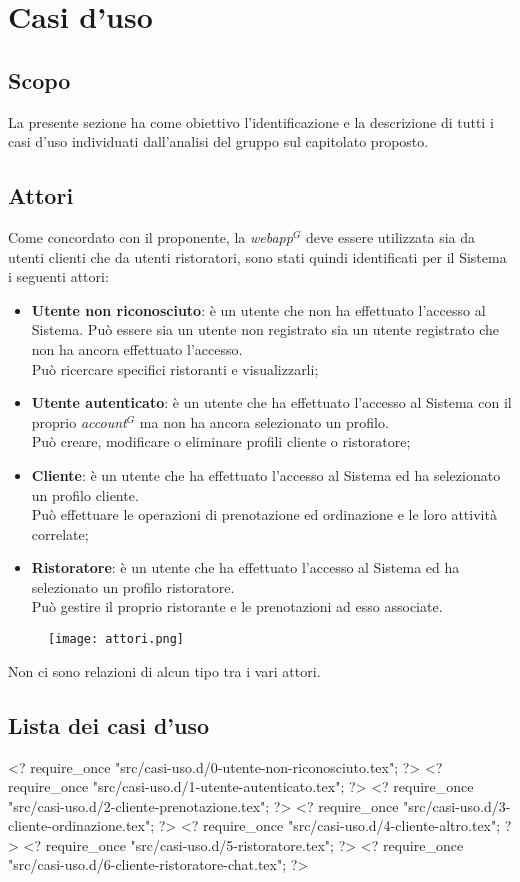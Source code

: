 \nonstopmode
\section{Casi d'uso}
\subsection{Scopo}

La presente sezione ha come obiettivo l'identificazione e la descrizione di tutti i casi d'uso individuati dall'analisi del gruppo sul capitolato proposto.

\subsection{Attori}
Come concordato con il proponente, la \emph{webapp}$^{G}$ deve essere utilizzata sia da utenti clienti che da utenti ristoratori, sono stati quindi identificati per il Sistema i seguenti attori:

\begin{itemize}
\item \textbf{Utente non riconosciuto}: è un utente che non ha effettuato l'accesso al Sistema. Può essere sia un utente non registrato sia un utente registrato che non ha ancora effettuato l'accesso.\\ Può ricercare specifici ristoranti e visualizzarli;
\item \textbf{Utente autenticato}: è un utente che ha effettuato l'accesso al Sistema con il proprio \emph{account}$^{G}$ ma non ha ancora selezionato un profilo.\\ Può creare, modificare o eliminare profili cliente o ristoratore;
\item \textbf{Cliente}: è un utente che ha effettuato l'accesso al Sistema ed ha selezionato un profilo cliente.\\ Può effettuare le operazioni di prenotazione ed ordinazione e le loro attività correlate;
\item \textbf{Ristoratore}: è un utente che ha effettuato l'accesso al Sistema ed ha selezionato un profilo ristoratore.\\ Può gestire il proprio ristorante e le prenotazioni ad esso associate.
\end{itemize}
\begin{figure}[h] \texttt{[image: attori.png]} \end{figure}

Non ci sono relazioni di alcun tipo tra i vari attori.

\pagebreak
\subsection{Lista dei casi d'uso}

<? require_once "src/casi-uso.d/0-utente-non-riconosciuto.tex"; ?>
<? require_once "src/casi-uso.d/1-utente-autenticato.tex"; ?>
<? require_once "src/casi-uso.d/2-cliente-prenotazione.tex"; ?>
<? require_once "src/casi-uso.d/3-cliente-ordinazione.tex"; ?>
<? require_once "src/casi-uso.d/4-cliente-altro.tex"; ?>
<? require_once "src/casi-uso.d/5-ristoratore.tex"; ?>
<? require_once "src/casi-uso.d/6-cliente-ristoratore-chat.tex"; ?>

